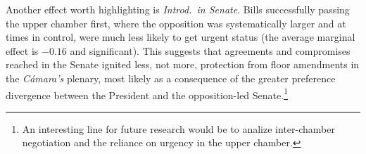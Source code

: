 \documentclass[letter,12pt]{article}
\begin{document}



Another effect worth highlighting is \emph{Introd.\ in Senate}. Bills successfully passing the upper chamber first, where the opposition was systematically larger and at times in control, were much less likely to get urgent status (the average marginal effect is $-0.16$ and significant). This suggests that agreements and compromises reached in the Senate ignited less, not more, protection from floor amendments in the \emph{Cámara's} plenary, most likely as a consequence of the greater preference divergence between the President and the opposition-led Senate.\footnote{An interesting line for future research would be to analize inter-chamber negotiation and the reliance on urgency in the upper chamber.} 
\end{document}
